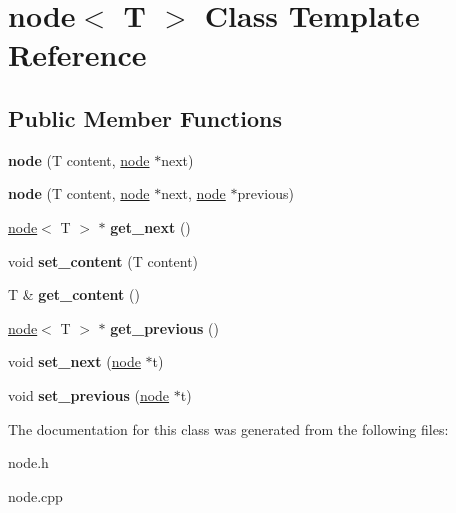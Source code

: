 \hypertarget{classnode}{}\section{node$<$ T $>$ Class Template Reference}
\label{classnode}
\subsection*{Public Member Functions}
\begin{DoxyCompactItemize}
\item 
\mbox{\label{classnode_a6e6cd22c4f5f8bc2550df559fbf72868}} 
{\bfseries node} (T content, \mbox{\hyperlink{classnode}{node}} $\ast$next)
\item 
\mbox{\label{classnode_a8c93cbaaeb21e2cbf7b33a798e80e1d4}} 
{\bfseries node} (T content, \mbox{\hyperlink{classnode}{node}} $\ast$next, \mbox{\hyperlink{classnode}{node}} $\ast$previous)
\item 
\mbox{\label{classnode_aba58b2053578ed19e6ec476d143e283f}} 
\mbox{\hyperlink{classnode}{node}}$<$ T $>$ $\ast$ {\bfseries get\+\_\+next} ()
\item 
\mbox{\label{classnode_a3c2d87fda8dd7c8ac7eac00508e6f687}} 
void {\bfseries set\+\_\+content} (T content)
\item 
\mbox{\label{classnode_a937aba557a1daca1979dbed74c3f1e6d}} 
T \& {\bfseries get\+\_\+content} ()
\item 
\mbox{\label{classnode_a96bcdfa5e87aaa7f837a5701954e2c5a}} 
\mbox{\hyperlink{classnode}{node}}$<$ T $>$ $\ast$ {\bfseries get\+\_\+previous} ()
\item 
\mbox{\label{classnode_abd3f65ad428894ee53c8f9e8c3f93138}} 
void {\bfseries set\+\_\+next} (\mbox{\hyperlink{classnode}{node}} $\ast$t)
\item 
\mbox{\label{classnode_a460d426c31fa387143a3798707f45e97}} 
void {\bfseries set\+\_\+previous} (\mbox{\hyperlink{classnode}{node}} $\ast$t)
\end{DoxyCompactItemize}


The documentation for this class was generated from the following files\+:\begin{DoxyCompactItemize}
\item 
node.\+h\item 
node.\+cpp\end{DoxyCompactItemize}
